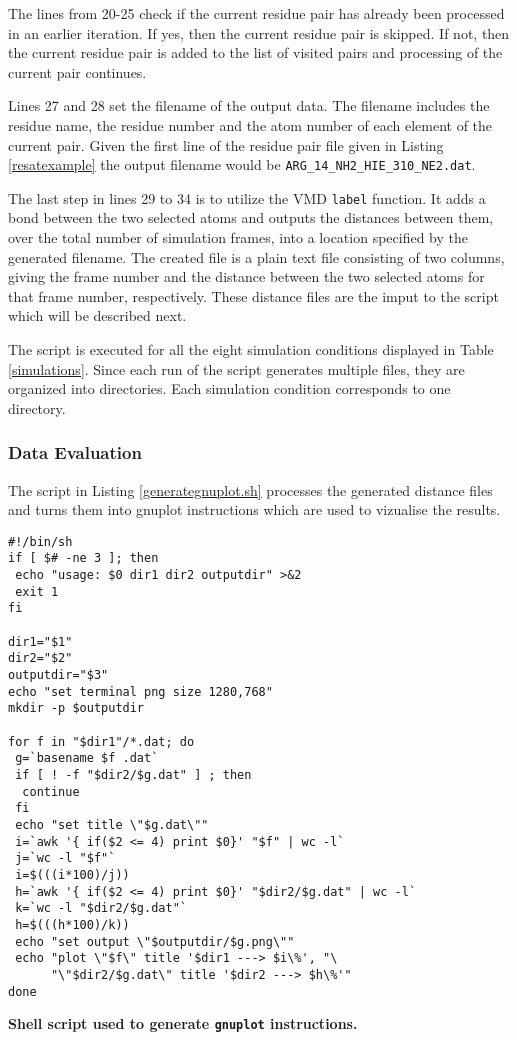 \documentclass[11pt,twocolumn]{article}
\begin{document}
The lines from 20-25 check if the current residue pair has already been processed in an earlier iteration. If yes, then the current residue pair is skipped. If not, then the current residue pair is added to the list of visited pairs and processing of the current pair continues.  

Lines 27 and 28 set the filename of the output data. The filename includes the residue name, the residue number and the atom number of each element of the current pair. Given the first line of the residue pair file given in Listing \ref{resatexample} the output filename would be \texttt{ARG\_14\_NH2\_HIE\_310\_NE2.dat}.

The last step in lines 29 to 34 is to utilize the VMD \texttt{label} function. It adds a bond between the two selected atoms and outputs the distances between them, over the total number of simulation frames, into a location specified by the generated filename. The created file is a plain text file consisting of two columns, giving the frame number and the distance between the two selected atoms for that frame number, respectively. These distance files are the imput to the script which will be described next.

The script is executed for all the eight simulation conditions displayed in Table \ref{simulations}. Since each run of the script generates multiple files, they are organized into directories. Each simulation condition corresponds to one directory.

\subsubsection*{Data Evaluation}

The script in Listing \ref{generategnuplot.sh} processes the generated distance files and turns them into gnuplot instructions which are used to vizualise the results.

\begin{listing}
\begin{verbatim}
#!/bin/sh
if [ $# -ne 3 ]; then 
 echo "usage: $0 dir1 dir2 outputdir" >&2
 exit 1
fi

dir1="$1"
dir2="$2"
outputdir="$3"
echo "set terminal png size 1280,768" 
mkdir -p $outputdir

for f in "$dir1"/*.dat; do
 g=`basename $f .dat`
 if [ ! -f "$dir2/$g.dat" ] ; then 
  continue
 fi
 echo "set title \"$g.dat\""
 i=`awk '{ if($2 <= 4) print $0}' "$f" | wc -l`
 j=`wc -l "$f"`
 i=$(((i*100)/j))
 h=`awk '{ if($2 <= 4) print $0}' "$dir2/$g.dat" | wc -l`
 k=`wc -l "$dir2/$g.dat"`
 h=$(((h*100)/k))
 echo "set output \"$outputdir/$g.png\""
 echo "plot \"$f\" title '$dir1 ---> $i\%', "\
      "\"$dir2/$g.dat\" title '$dir2 ---> $h\%'"
done
\end{verbatim}
\caption{\textbf{Shell script used to generate \texttt{gnuplot} instructions.}}\label{generategnuplot.sh}
\end{listing}
\end{document}
